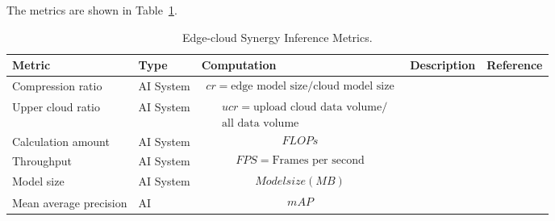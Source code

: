 The metrics are shown in Table~\ref{tab:esi}.

\begin{table}[h!]
\caption{Edge-cloud Synergy Inference Metrics.} 
\label{tab:esi}
\begin{tabular}{|p{2cm}|l|p{6cm}|p{3cm}|p{1.5cm}|}

\hline
Metric                 & Type      & Computation & Description                                                                & Reference 
\\ \hline

Compression ratio
& AI System
& 
\parbox{3cm}{
    \begin{equation} \label{equ:cr}
    \begin{split}
cr =  \text{edge model size}  /  \text{cloud model size}
    \end{split} 
    \end{equation} 
}
& 
&      
\\ \hline

Upper cloud ratio
& AI System
& 
\parbox{3cm}{
    \begin{equation} \label{equ:ucr}
    \begin{split} 
& ucr = \text{upload cloud data volume} /  \\
& \text{all data volume} 
    \end{split} 
    \end{equation} 
}
& 
&      
\\ \hline

Calculation amount
& AI System
& 
\parbox{3cm}{
    \begin{equation} \label{equ:flops} 
    \begin{split}
FLOPs
    \end{split} 
    \end{equation} 
}
& 
&      
\\ \hline

Throughput
& AI System
& 
\parbox{3cm}{
    \begin{equation} \label{equ:fps} 
    \begin{split}
FPS =  \text{Frames per second} 
    \end{split} 
    \end{equation} 
}
& 
&      
\\ \hline

Model size
& AI System
& 
\parbox{3cm}{
    \begin{equation} \label{equ:mz} 
    \begin{split}
Model size (MB)
    \end{split} 
    \end{equation} 
}
& 
&      
\\ \hline

Mean average precision
& AI 
& 
\parbox{3cm}{
    \begin{equation} \label{equ:map} 
    \begin{split}
mAP
    \end{split} 
    \end{equation} 
}
& 
&      
\\ \hline
\end{tabular}
\end{table}



